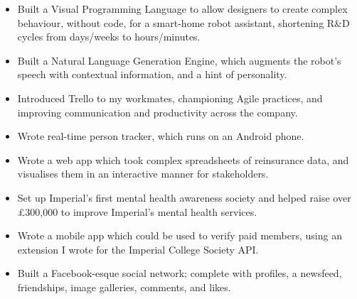 \documentclass{jcgcv}
\begin{document}
\begin{column}
  \begin{itemize}
    \item Built a Visual Programming Language to allow designers to create
          complex behaviour, without code, for a smart-home robot assistant,
          shortening R\&D cycles from days/weeks to hours/minutes.
    \item Built a Natural Language Generation Engine, which augments the
          robot's speech with contextual information, and a hint of personality.
    \item Introduced Trello to my workmates, championing Agile practices, and
          improving communication and productivity across the company.
  \end{itemize}

  \begin{itemize}
    \item Wrote real-time person tracker, which runs on an Android phone.
  \end{itemize}

  \begin{itemize}
    \item Wrote a web app which took complex spreadsheets of reinsurance
          data, and visualises them in an interactive manner for stakeholders.
  \end{itemize}

  \begin{itemize}
    \item Set up Imperial's first mental health awareness society and helped
          raise over \pounds300,000 to improve Imperial's mental health services.
  \end{itemize}

  \begin{itemize}
    \item Wrote a mobile app which could be used to verify paid members, using
          an extension I wrote for the Imperial College Society API.
  \end{itemize}

  \begin{itemize}
    \item Built a Facebook-esque social network; complete with profiles, a newsfeed,
          friendships, image galleries, comments, and likes.
  \end{itemize}


\end{column}
\end{document}
